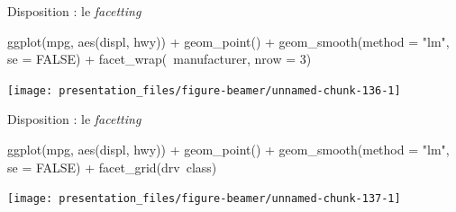 \documentclass[12pt,ignorenonframetext,handout,]{beamer}
\newenvironment{Shaded}{}{}
\newcommand{\DataTypeTok}[1]{#1}
\newcommand{\DecValTok}[1]{#1}
\newcommand{\KeywordTok}[1]{\textcolor[rgb]{0.00,0.00,1.00}{#1}}
\newcommand{\NormalTok}[1]{#1}
\newcommand{\OperatorTok}[1]{#1}
\newcommand{\OtherTok}[1]{\textcolor[rgb]{1.00,0.25,0.00}{#1}}
\newcommand{\StringTok}[1]{\textcolor[rgb]{0.00,0.50,0.50}{#1}}
\renewenvironment{Shaded}{\begin{snugshade}}{\end{snugshade}}
\begin{document}
\begin{frame}[fragile]{Disposition : le \emph{facetting}}
\protect\hypertarget{disposition-le-facetting}{}

\footnotesize \center

\begin{Shaded}
\begin{Highlighting}[]
\KeywordTok{ggplot}\NormalTok{(mpg, }\KeywordTok{aes}\NormalTok{(displ, hwy)) }\OperatorTok{+}
\StringTok{  }\KeywordTok{geom_point}\NormalTok{() }\OperatorTok{+}\StringTok{ }\KeywordTok{geom_smooth}\NormalTok{(}\DataTypeTok{method =} \StringTok{"lm"}\NormalTok{, }\DataTypeTok{se =} \OtherTok{FALSE}\NormalTok{) }\OperatorTok{+}\StringTok{ }
\StringTok{  }\KeywordTok{facet_wrap}\NormalTok{(}\OperatorTok{~}\NormalTok{manufacturer, }\DataTypeTok{nrow =} \DecValTok{3}\NormalTok{)}
\end{Highlighting}
\end{Shaded}

\texttt{[image: presentation\_files/figure-beamer/unnamed-chunk-136-1]}

\end{frame}

\begin{frame}[fragile]{Disposition : le \emph{facetting}}
\protect\hypertarget{disposition-le-facetting-1}{}

\footnotesize \center

\begin{Shaded}
\begin{Highlighting}[]
\KeywordTok{ggplot}\NormalTok{(mpg, }\KeywordTok{aes}\NormalTok{(displ, hwy)) }\OperatorTok{+}
\StringTok{  }\KeywordTok{geom_point}\NormalTok{() }\OperatorTok{+}\StringTok{ }\KeywordTok{geom_smooth}\NormalTok{(}\DataTypeTok{method =} \StringTok{"lm"}\NormalTok{, }\DataTypeTok{se =} \OtherTok{FALSE}\NormalTok{) }\OperatorTok{+}\StringTok{ }
\StringTok{  }\KeywordTok{facet_grid}\NormalTok{(drv}\OperatorTok{~}\NormalTok{class)}
\end{Highlighting}
\end{Shaded}

\texttt{[image: presentation\_files/figure-beamer/unnamed-chunk-137-1]}

\end{frame}
\end{document}
